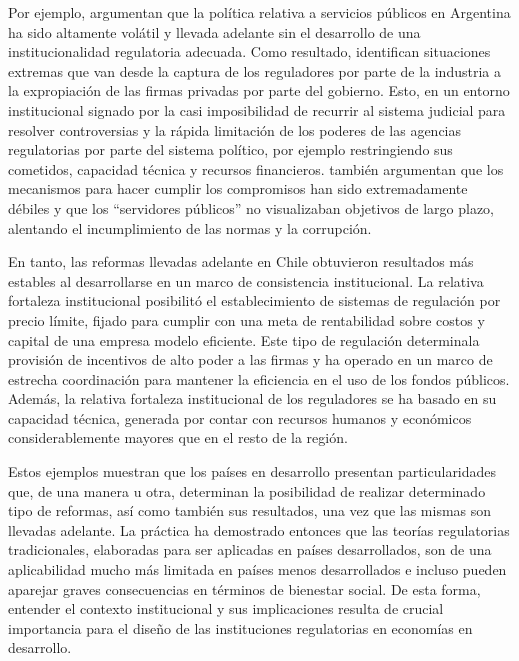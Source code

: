 \documentclass[
  12pt,
  spanish,
]{book}
\begin{document}
Por ejemplo, \citet{Bergara2005} argumentan que la política relativa a servicios públicos en Argentina ha sido altamente volátil y llevada adelante sin el desarrollo de una institucionalidad regulatoria adecuada. Como resultado, identifican situaciones extremas que van desde la captura de los reguladores por parte de la industria a la expropiación de las firmas privadas por parte del gobierno. Esto, en un entorno institucional signado por la casi imposibilidad de recurrir al sistema judicial para resolver controversias y la rápida limitación de los poderes de las agencias regulatorias por parte del sistema político, por ejemplo restringiendo sus cometidos, capacidad técnica y recursos financieros. \citet{Spiller2003} también argumentan que los mecanismos para hacer cumplir los compromisos han sido extremadamente débiles y que los ``servidores públicos'' no visualizaban objetivos de largo plazo, alentando el incumplimiento de las normas y la corrupción.

En tanto, las reformas llevadas adelante en Chile obtuvieron resultados más estables al desarrollarse en un marco de consistencia institucional. La relativa fortaleza institucional posibilitó el establecimiento de sistemas de regulación por precio límite, fijado para cumplir con una meta de rentabilidad sobre costos y capital de una empresa modelo eficiente. Este tipo de regulación determinala provisión de incentivos de alto poder a las firmas y ha operado en un marco de estrecha coordinación para mantener la eficiencia en el uso de los fondos públicos. Además, la relativa fortaleza institucional de los reguladores se ha basado en su capacidad técnica, generada por contar con recursos humanos y económicos considerablemente mayores que en el resto de la región.

Estos ejemplos muestran que los países en desarrollo presentan particularidades que, de una manera u otra, determinan la posibilidad de realizar determinado tipo de reformas, así como también sus resultados, una vez que las mismas son llevadas adelante. La práctica ha demostrado entonces que las teorías regulatorias tradicionales, elaboradas para ser aplicadas en países desarrollados, son de una aplicabilidad mucho más limitada en países menos desarrollados e incluso pueden aparejar graves consecuencias en términos de bienestar social. De esta forma, entender el contexto institucional y sus implicaciones resulta de crucial importancia para el diseño de las instituciones regulatorias en economías en desarrollo.
\end{document}
